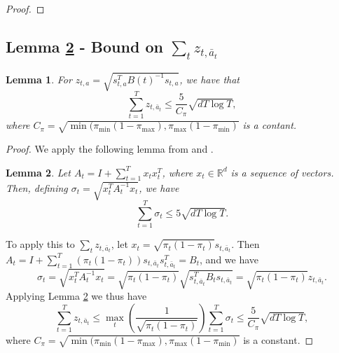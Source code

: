 \documentclass{article}
\newtheorem{lemma}{Lemma}
\begin{document}
\begin{appendices}
\begin{proof}
\end{proof}

\subsection{Lemma \ref{lemm:sumz} - Bound on $\sum_t z_{t,\bar{a}_t}$}
\begin{lemma}
For $z_{t,a} = \sqrt{s_{t,a}^T B(t)^{-1} s_{t,a}}$, we have that 
\[
\sum_{t=1}^T z_{t,\bar{a}_t}  \leq \frac{5}{C_\pi} \sqrt{d T \log T},
\]
where $C_\pi = \sqrt{\min(\pi_{\min}(1-\pi_{\max}), \pi_{\max}(1-\pi_{\min})}$ is a contant.
\end{lemma}

\begin{proof}
We apply the following lemma from \cite{auer2002nonstochastic} and \cite{chu2011contextual}. 
\begin{lemma}
\label{lemm:sumz}
Let $A_t = I + \sum_{t=1}^T x_t x_t^T$, where $x_t \in \mathbb{R}^d$ is a sequence of vectors. Then, defining $\sigma_t = \sqrt{x_t^T A_t^{-1} x_t}$, we have
\[
\sum_{t =1 }^T \sigma_t \leq 5 \sqrt{d T \log T}.
\]
\end{lemma}
To apply this to $\sum_t z_{t,\bar{a}_t}$, let $x_t = \sqrt{\pi_t(1-\pi_t)}s_{t,\bar{a}_t}$. Then $A_t = I + \sum_{t=1}^T (\pi_t(1-\pi_t))s_{t,\bar{a}_t}s_{t,\bar{a}_t}^T = B_t$, and we have
\[
\sigma_t =  \sqrt{x_t^T A_t^{-1} x_t} =\sqrt{\pi_t (1-\pi_t)}\sqrt{s_{t,\bar{a}_t}^T B_t s_{t,\bar{a}_t}} = \sqrt{\pi_t (1-\pi_t)}z_{t,\bar{a}_t}.
\]
Applying Lemma \ref{lemm:sumz} we thus have %
\[
\sum_{t=1}^T z_{t,\bar{a}_t} \leq \max_{t}\left(\frac{1}{\sqrt{\pi_t (1-\pi_t)}}\right) \sum_{t=1}^T\sigma_t \leq \frac{5}{C_\pi} \sqrt{d T \log T},
\]
where $C_\pi = \sqrt{\min(\pi_{\min}(1-\pi_{\max}), \pi_{\max}(1-\pi_{\min})}$ is a constant.
\end{proof}




\end{appendices}
\end{document}
